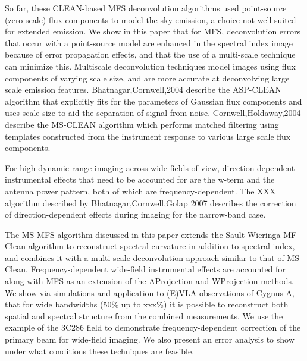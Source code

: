 \documentclass[structabstract]{aa}
\begin{document}
So far, these CLEAN-based MFS deconvolution algorithms used 
point-source (zero-scale) flux components to model the sky emission,
a choice not well suited for extended emission.
We show in this paper that for MFS, deconvolution errors that occur with a point-source
model are enhanced in the spectral index image because of error propagation effects, and
that the use of a multi-scale technique can minimize this.
Multiscale deconvolution techniques model images using flux
components of varying scale size, and are more accurate at deconvolving large scale emission
features. Bhatnagar,Cornwell,2004 describe the ASP-CLEAN algorithm that explicitly fits 
for the parameters of Gaussian flux components and uses scale size to aid the separation of
signal from noise. Cornwell,Holdaway,2004 describe the MS-CLEAN algorithm which performs
matched filtering using templates constructed from the instrument response to various large 
scale flux components.

For high dynamic range imaging across wide fields-of-view,
direction-dependent instrumental effects that need to be accounted for are 
the w-term and the antenna power pattern, both of which are frequency-dependent. 
The XXX algorithm described by Bhatnagar,Cornwell,Golap 2007 describes the correction of
direction-dependent effects during imaging for the narrow-band case.


   The MS-MFS algorithm discussed in this paper extends the Sault-Wieringa MF-Clean 
    algorithm to reconstruct spectral curvature in addition to spectral index,
    and combines it with a  multi-scale deconvolution approach similar to that of MS-Clean.
    Frequency-dependent wide-field instrumental effects are accounted for
    along with MFS as an extension of the AProjection and WProjection methods.
   We show via simulations and application to (E)VLA observations of Cygnus-A,
    that for wide bandwidths (50\% up to xxx\%)
    it is possible to reconstruct both spatial and spectral structure from the
    combined measurements.
    We use the example of the 3C286 field to demonstrate
    frequency-dependent correction of the primary beam for wide-field imaging.
    We also present an error analysis to show
    under what conditions these techniques are feasible. %
\end{document}
